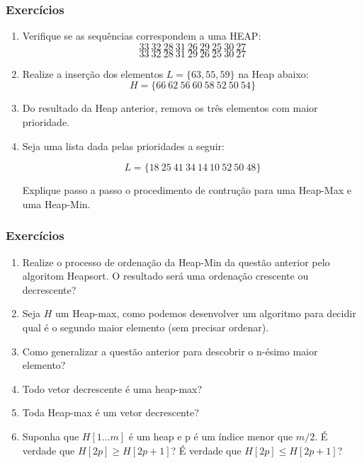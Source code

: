 \documentclass[10pt]{beamer}
\begin{document}
\begin{frame}
    \frametitle{Exercícios}

    \begin{enumerate}
        \item Verifique se as sequências correspondem a uma HEAP:
              $$33\ 32\ 28\ 31\ 26\ 29\ 25\ 30\ 27$$
              $$33\ 32\ 28\ 31\ 29\ 26\ 25\ 30\ 27$$

        \item Realize a inserção dos elementos $L = \{63, 55, 59\}$ na Heap abaixo:
              $$H = \{66\ 62\ 56\ 60\ 58\ 52\ 50\ 54\}$$
        \item Do resultado da Heap anterior, remova os três elementos com maior prioridade.
        \item Seja uma lista dada pelas prioridades a seguir:

              $$ L=\{18\ 25\ 41\ 34\ 14\ 10\ 52\ 50\ 48\}$$

              Explique passo a passo o procedimento de contrução para uma Heap-Max e uma Heap-Min.





    \end{enumerate}

\end{frame}

\begin{frame}
    \frametitle{Exercícios}
    \begin{enumerate}\addtocounter{enumi}{4}\setlength{\itemsep}{1em}
        \item Realize o processo de ordenação da Heap-Min da questão anterior pelo algoritom Heapsort. O resultado será uma ordenação crescente ou decrescente?
        \item Seja $H$ um Heap-max, como podemos desenvolver um algoritmo para decidir qual é o segundo maior elemento (sem precisar ordenar).
        \item Como generalizar a questão anterior para descobrir o n-ésimo maior elemento?
        \item Todo vetor decrescente é uma heap-max?
        \item Toda Heap-max é um vetor decrescente?
        \item  Suponha que $H[1\ldots m]$ é um heap e p é um índice menor que $m/2$.  É verdade que $H[2p] \geq H[2p+1]$?  É verdade que $H[2p] \leq H[2p+1]$?
    \end{enumerate}
\end{frame}
\end{document}
